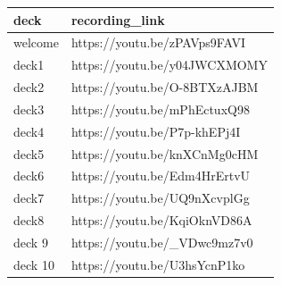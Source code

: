 \documentclass[
]{book}
\begin{document}
\begin{tabular}{ll}
\toprule
deck & recording\_link\\
\midrule
welcome & https://youtu.be/zPAVps9FAVI\\
deck1 & https://youtu.be/y04JWCXMOMY\\
deck2 & https://youtu.be/O-8BTXzAJBM\\
deck3 & https://youtu.be/mPhEctuxQ98\\
deck4 & https://youtu.be/P7p-khEPj4I\\
\addlinespace
deck5 & https://youtu.be/knXCnMg0cHM\\
deck6 & https://youtu.be/Edm4HrErtvU\\
deck7 & https://youtu.be/UQ9nXcvplGg\\
deck8 & https://youtu.be/KqiOknVD86A\\
deck 9 & https://youtu.be/\_VDwc9mz7v0\\
\addlinespace
deck 10 & https://youtu.be/U3hsYcnP1ko\\
\bottomrule
\end{tabular}

  
\end{document}
